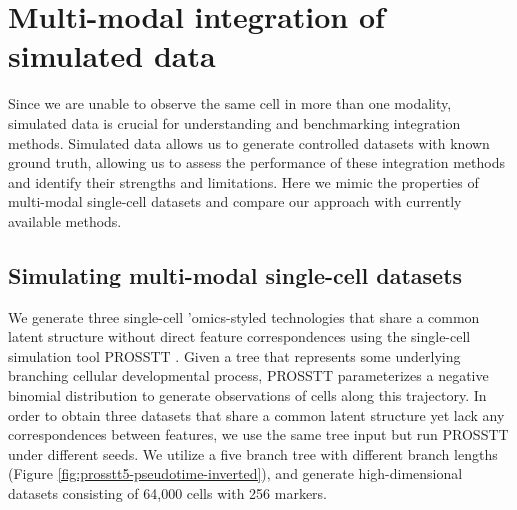 \section{Multi-modal integration of simulated data}
Since we are unable to observe the same cell in more than one modality, simulated data is crucial for understanding and benchmarking integration methods.
Simulated data allows us to generate controlled datasets with known ground truth, allowing us to assess the performance of these integration methods and identify their strengths and limitations.
Here we mimic the properties of multi-modal single-cell datasets and compare our approach with currently available methods.

\subsection{Simulating multi-modal single-cell datasets}
 We generate three single-cell 'omics-styled technologies that share a common latent structure without direct feature correspondences using the single-cell simulation tool PROSSTT \citep{papadopoulos2019}.
Given a tree that represents some underlying branching cellular developmental process, PROSSTT parameterizes a negative binomial distribution to generate observations of cells along this trajectory.
In order to obtain three datasets that share a common latent structure yet lack any correspondences between features,  we use the same tree input but run PROSSTT under different seeds.
We utilize a five branch tree with different branch lengths (Figure \ref{fig:prosstt5-pseudotime-inverted}),
and generate high-dimensional datasets consisting of 64,000 cells with 256 markers.

